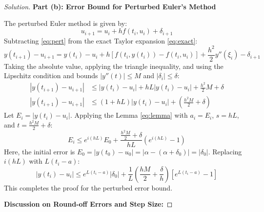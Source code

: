 \documentclass[11pt, a4paper]{article}
\newif\ifsolutionnewpage
\newenvironment{solution}
  {\begin{proof}[Solution]}
  {\end{proof}\ifsolutionnewpage\newpage\fi}
\begin{document}
\begin{solution}
    \vspace{0.3cm}
    \textbf{Part (b): Error Bound for Perturbed Euler's Method}
    
    The perturbed Euler method is given by:
    \begin{equation} \label{eq:pert}
    u_{i+1} = u_i + h f(t_i, u_i) + \delta_{i+1}
    \end{equation}
    Subtracting \eqref{eq:pert} from the exact Taylor expansion \eqref{eq:exact}:
    \begin{equation*}
    y(t_{i+1}) - u_{i+1} = y(t_i) - u_i + h [f(t_i, y(t_i)) - f(t_i, u_i)] + \frac{h^2}{2} y''(\xi_i) - \delta_{i+1}
    \end{equation*}
    Taking the absolute value, applying the triangle inequality, and using the Lipschitz condition and bounds $|y''(t)| \le M$ and $|\delta_i| \le \delta$:
    \begin{align*}
    |y(t_{i+1}) - u_{i+1}| &\le |y(t_i) - u_i| + h L |y(t_i) - u_i| + \frac{h^2}{2} M + \delta \\
    |y(t_{i+1}) - u_{i+1}| &\le (1 + hL)|y(t_i) - u_i| + \left( \frac{h^2 M}{2} + \delta \right)
    \end{align*}
    Let $E_i = |y(t_i) - u_i|$. Applying the Lemma \eqref{eq:lemma} with $a_i = E_i$, $s = hL$, and $t = \frac{h^2 M}{2} + \delta$:
    \begin{equation*}
    E_i \le e^{i(hL)} E_0 + \frac{\frac{h^2 M}{2} + \delta}{hL} (e^{i(hL)} - 1)
    \end{equation*}
    Here, the initial error is $E_0 = |y(t_0) - u_0| = |\alpha - (\alpha + \delta_0)| = |\delta_0|$. Replacing $i(hL)$ with $L(t_i - a)$:
    \begin{equation*}
    |y(t_i) - u_i| \le e^{L(t_i - a)}|\delta_0| + \frac{1}{L}\left( \frac{hM}{2} + \frac{\delta}{h} \right) [e^{L(t_i - a)} - 1]
    \end{equation*}
    This completes the proof for the perturbed error bound.
    
    \vspace{0.3cm}
    \textbf{Discussion on Round-off Errors and Step Size:}
    

\end{solution}
\end{document}
